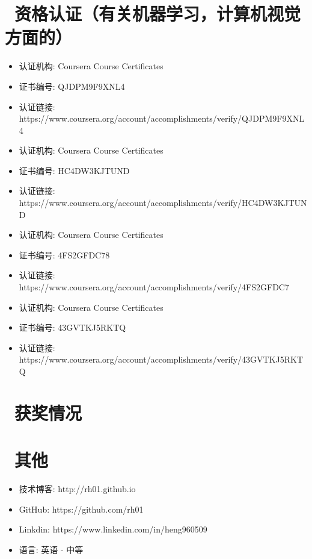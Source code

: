 \documentclass{resume}
\begin{document}
\section{\faCreditCard\ 资格认证（有关机器学习，计算机视觉方面的）}
\begin{itemize}
  \item 认证机构: Coursera Course Certificates
  \item 证书编号: QJDPM9F9XNL4
  \item 认证链接: https://www.coursera.org/account/accomplishments/verify/QJDPM9F9XNL4
\end{itemize}
\begin{itemize}
  \item 认证机构: Coursera Course Certificates
  \item 证书编号: HC4DW3KJTUND
  \item 认证链接: https://www.coursera.org/account/accomplishments/verify/HC4DW3KJTUND
\end{itemize}
\begin{itemize}
  \item 认证机构: Coursera Course Certificates
  \item 证书编号: 4FS2GFDC78
  \item 认证链接: https://www.coursera.org/account/accomplishments/verify/4FS2GFDC7
\end{itemize}

\begin{itemize}
  \item 认证机构: Coursera Course Certificates
  \item 证书编号: 43GVTKJ5RKTQ
  \item 认证链接: https://www.coursera.org/account/accomplishments/verify/43GVTKJ5RKTQ
\end{itemize}

\section{\faHeart\ 获奖情况}

\section{\faInfo\ 其他}
\begin{itemize}[parsep=0.5ex]
  \item 技术博客: http://rh01.github.io
  \item GitHub: https://github.com/rh01
  \item Linkdin: https://www.linkedin.com/in/heng960509
  \item 语言: 英语 - 中等
\end{itemize}
\end{document}

